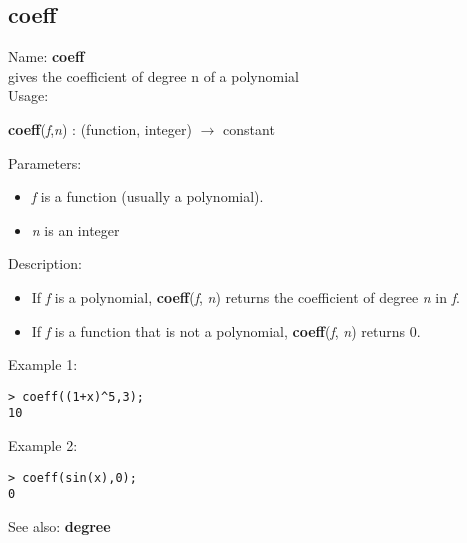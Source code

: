 \subsection{ coeff }
\noindent Name: \textbf{coeff}\\
gives the coefficient of degree n of a polynomial\\

\noindent Usage: 
\begin{center}
\textbf{coeff}(\emph{f},\emph{n}) : (\textsf{function}, \textsf{integer}) $\rightarrow$ \textsf{constant}\\
\end{center}
Parameters: 
\begin{itemize}
\item \emph{f} is a function (usually a polynomial).
\item \emph{n} is an integer
\end{itemize}
\noindent Description: \begin{itemize}

\item If \emph{f} is a polynomial, \textbf{coeff}(\emph{f}, \emph{n}) returns the coefficient of
   degree \emph{n} in \emph{f}.

\item If \emph{f} is a function that is not a polynomial, \textbf{coeff}(\emph{f}, \emph{n}) returns 0.
\end{itemize}
\noindent Example 1: 
\begin{center}\begin{minipage}{15cm}\begin{Verbatim}[frame=single]
> coeff((1+x)^5,3);
10
\end{Verbatim}
\end{minipage}\end{center}
\noindent Example 2: 
\begin{center}\begin{minipage}{15cm}\begin{Verbatim}[frame=single]
> coeff(sin(x),0);
0
\end{Verbatim}
\end{minipage}\end{center}
See also: \textbf{degree}
